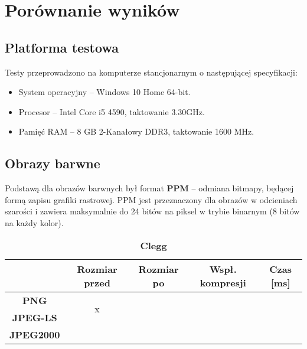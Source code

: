 \section{Porównanie wyników}

\subsection{Platforma testowa}

Testy przeprowadzono na komputerze stancjonarnym o następującej specyfikacji:

\begin{itemize}
	\item System operacyjny -- Windows 10 Home 64-bit.
	\item Procesor -- Intel Core i5 4590, taktowanie 3.30GHz.
	\item Pamięć RAM -- 8 GB 2-Kanałowy DDR3, taktowanie 1600 MHz.
\end{itemize}

\subsection{Obrazy barwne}

Podstawą dla obrazów barwnych był format \textbf{PPM} -- odmiana bitmapy, będącej formą zapisu grafiki rastrowej. PPM jest przeznaczony dla obrazów w odcieniach szarości i zawiera maksymalnie do 24 bitów na piksel w trybie binarnym (8 bitów na każdy kolor).

\begin{table}[!h]
	\centering
	\caption{\textbf{Clegg}}
	\label{my-label}
	\begin{tabular}{|c|c|c|c|c|}                                             
		\hline
		& \textbf{Rozmiar przed} & \textbf{Rozmiar po} & \textbf{Wspł. kompresji} & \textbf{Czas {[}ms{]}} \\ \hline 
		\textbf{PNG}      &          \multicolumn{1}{c|}{\multirow{2}{*}{x}}             &                     &                          &                             \\\cline{3-5}
		\textbf{JPEG-LS}  &                        &                     &                          &                          \\\cline{3-5}
		\textbf{JPEG2000} &                        &                     &                          &                      \\ \hline
	\end{tabular}
\end{table}

